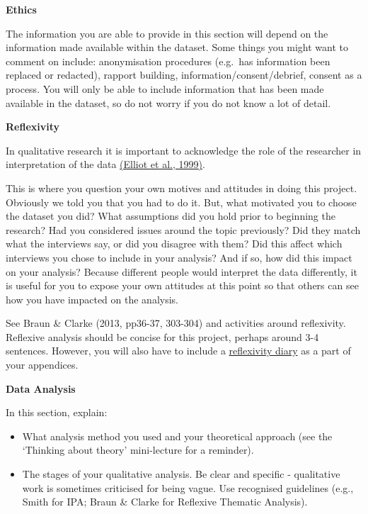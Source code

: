 \documentclass[
  english,
  letterpaper,
  DIV=11,
  numbers=noendperiod]{scrreprt}
\providecommand{\tightlist}{%
  \setlength{\itemsep}{0pt}\setlength{\parskip}{0pt}}
\begin{document}
\textbf{Ethics}

The information you are able to provide in this section will depend on
the information made available within the dataset. Some things you might
want to comment on include: anonymisation procedures (e.g.~has
information been replaced or redacted), rapport building,
information/consent/debrief, consent as a process. You will only be able
to include information that has been made available in the dataset, so
do not worry if you do not know a lot of detail.

\textbf{Reflexivity}

In qualitative research it is important to acknowledge the role of the
researcher in interpretation of the data
\href{https://bpspsychub.onlinelibrary.wiley.com/doi/10.1348/014466599162782}{(Elliot
et al., 1999)}.

This is where you question your own motives and attitudes in doing this
project. Obviously we told you that you had to do it. But, what
motivated you to choose the dataset you did? What assumptions did you
hold prior to beginning the research? Had you considered issues around
the topic previously? Did they match what the interviews say, or did you
disagree with them? Did this affect which interviews you chose to
include in your analysis? And if so, how did this impact on your
analysis? Because different people would interpret the data differently,
it is useful for you to expose your own attitudes at this point so that
others can see how you have impacted on the analysis.

See Braun \& Clarke (2013, pp36-37, 303-304) and activities around
reflexivity. Reflexive analysis should be concise for this project,
perhaps around 3-4 sentences. However, you will also have to include a
\href{https://gla-my.sharepoint.com/:w:/g/personal/ashley_robertson_glasgow_ac_uk/IQC1PIxhBlndR74S_nfeKHNlAW5uQmGOpoRXCpLHC2fI_fI?e=aunShJ}{reflexivity
diary} as a part of your appendices.

\textbf{Data Analysis}

In this section, explain:

\begin{itemize}
\tightlist
\item
  What analysis method you used and your theoretical approach (see the
  `Thinking about theory' mini-lecture for a reminder).
\item
  The stages of your qualitative analysis. Be clear and specific -
  qualitative work is sometimes criticised for being vague. Use
  recognised guidelines (e.g., Smith for IPA; Braun \& Clarke for
  Reflexive Thematic Analysis).
\end{itemize}
\end{document}
